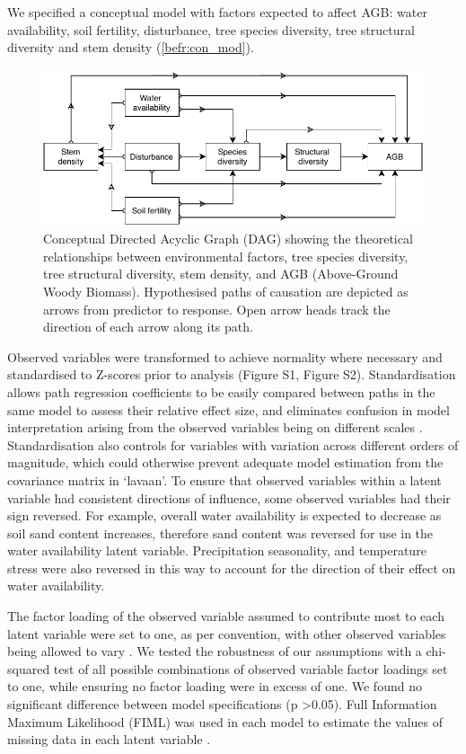 \begin{refsection}
We specified a conceptual model with factors expected to affect AGB: water availability, soil fertility, disturbance, tree species diversity, tree structural diversity and stem density (\autoref{befr:con_mod}). 

\begin{figure}[tb]
\centering
\includegraphics[width=\textwidth]{img/concept.drawio}
\caption[Conceptual model path diagram]{Conceptual Directed Acyclic Graph (DAG) showing the theoretical relationships between environmental factors, tree species diversity, tree structural diversity, stem density, and AGB (Above-Ground Woody Biomass). Hypothesised paths of causation are depicted as arrows from predictor to response. Open arrow heads track the direction of each arrow along its path.}
	\label{befr:con_mod}
\end{figure}

Observed variables were transformed to achieve normality where necessary and standardised to Z-scores prior to analysis (Figure S1, Figure S2). Standardisation allows path regression coefficients to be easily compared between paths in the same model to assess their relative effect size, and eliminates confusion in model interpretation arising from the observed variables being on different scales \citep{Beaujean2014}. Standardisation also controls for variables with variation across different orders of magnitude, which could otherwise prevent adequate model estimation from the covariance matrix in `lavaan'. To ensure that observed variables within a latent variable had consistent directions of influence, some observed variables had their sign reversed. For example, overall water availability is expected to decrease as soil sand content increases, therefore sand content was reversed for use in the water availability latent variable. Precipitation seasonality, and temperature stress were also reversed in this way to account for the direction of their effect on water availability. 

The factor loading of the observed variable assumed to contribute most to each latent variable were set to one, as per convention, with other observed variables being allowed to vary \citep{Beaujean2014}. We tested the robustness of our assumptions with a chi-squared test of all possible combinations of observed variable factor loadings set to one, while ensuring no factor loading were in excess of one. We found no significant difference between model specifications (p >0.05). Full Information Maximum Likelihood (FIML) was used in each model to estimate the values of missing data in each latent variable \citep{Cham2017}.


\end{refsection}
